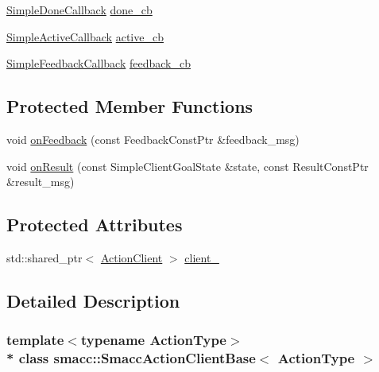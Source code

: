 \begin{DoxyCompactItemize}
\item 
\hyperlink{classsmacc_1_1SmaccActionClientBase_a185a419026fcdbec9ddf4703a1505524}{Simple\+Done\+Callback} \hyperlink{classsmacc_1_1SmaccActionClientBase_aea7036326fe0f2bb9355c71e80e36516}{done\+\_\+cb}
\item 
\hyperlink{classsmacc_1_1SmaccActionClientBase_ab99def4cdf0522abaf5a3bf7a444cfcb}{Simple\+Active\+Callback} \hyperlink{classsmacc_1_1SmaccActionClientBase_ac46979611051357b9fa54baa370f84d7}{active\+\_\+cb}
\item 
\hyperlink{classsmacc_1_1SmaccActionClientBase_ad8a68f659fb23e082e75d220515c76f3}{Simple\+Feedback\+Callback} \hyperlink{classsmacc_1_1SmaccActionClientBase_a64651f1579824551fb7a3b4862d4373d}{feedback\+\_\+cb}
\end{DoxyCompactItemize}
\subsection*{Protected Member Functions}
\begin{DoxyCompactItemize}
\item 
void \hyperlink{classsmacc_1_1SmaccActionClientBase_a83aeadef81ec8991e37d8e15f4f8c75d}{on\+Feedback} (const Feedback\+Const\+Ptr \&feedback\+\_\+msg)
\item 
void \hyperlink{classsmacc_1_1SmaccActionClientBase_ac6e4a07802f0fd820f4e5dae78535418}{on\+Result} (const Simple\+Client\+Goal\+State \&state, const Result\+Const\+Ptr \&result\+\_\+msg)
\end{DoxyCompactItemize}
\subsection*{Protected Attributes}
\begin{DoxyCompactItemize}
\item 
std\+::shared\+\_\+ptr$<$ \hyperlink{classsmacc_1_1SmaccActionClientBase_aea1392d9e41f48bda1de8acaec1c3233}{Action\+Client} $>$ \hyperlink{classsmacc_1_1SmaccActionClientBase_a10d3b707b855c6d360aeeb35e50cd0c7}{client\+\_\+}
\end{DoxyCompactItemize}


\subsection{Detailed Description}
\subsubsection*{template$<$typename Action\+Type$>$\\*
class smacc\+::\+Smacc\+Action\+Client\+Base$<$ Action\+Type $>$}



